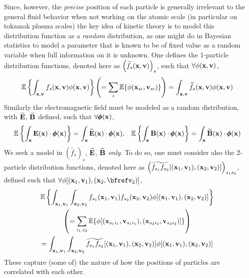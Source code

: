     Since, however, the \emph{precise} position of each particle is generally irrelevant to the general fluid behavior when not working on the atomic scale (in particular on tokamak plasma scales) the key idea of kinetic theory is to model this distribution function as a \emph{random} distribution, as one might do in Bayesian statistics to model a parameter that is known to be of fixed value as a random variable when full information on it is unknown. One defines the 1-particle distribution functions, denoted here as $\left(\widetilde{f_{s}}(\mathbf{x}, \mathbf{v})\right)_{s}$, such that $\forall \phi(\mathbf{x}, \mathbf{v})$,
    \begin{equation}
        \mathbb{E}\left\{\int_{\mathbf{x}, \mathbf{v}}f_{s}(\mathbf{x}, \mathbf{v})\phi(\mathbf{x}, \mathbf{v})\right\}
        \left(=  \sum_{i}\mathbb{E}\{\phi(\mathbf{x}_{si}, \mathbf{v}_{si})\}\right)
        =  \int_{\mathbf{x}, \mathbf{v}}\widetilde{f_{s}}(\mathbf{x}, \mathbf{v})\phi(\mathbf{x}, \mathbf{v})
    \end{equation}
    Similarly the electromagnetic field must be modeled as a random distribution, with $\widetilde{\mathbf{E}}$, $\widetilde{\mathbf{B}}$ defined, such that $\forall \pmb{\mathsf{\phi}}(\mathbf{x})$,
    \begin{align}
        \mathbb{E}\left\{\int_{\mathbf{x}}\mathbf{E}(\mathbf{x})\cdot\pmb{\mathsf{\phi}}(\mathbf{x})\right\}  =  \int_{\mathbf{x}}\widetilde{\mathbf{E}}(\mathbf{x})\cdot\pmb{\mathsf{\phi}}(\mathbf{x}),  && 
        \mathbb{E}\left\{\int_{\mathbf{x}}\mathbf{B}(\mathbf{x})\cdot\pmb{\mathsf{\phi}}(\mathbf{x})\right\}  =  \int_{\mathbf{x}}\widetilde{\mathbf{B}}(\mathbf{x})\cdot\pmb{\mathsf{\phi}}(\mathbf{x})
    \end{align}
    We seek a model in $\left(\widetilde{f_{s}}\right)_{s}$, $\widetilde{\mathbf{E}}$, $\widetilde{\mathbf{B}}$ \emph{only}. To do so, one must consider also the 2-particle distribution functions, denoted here as $\left(\widetilde{f_{s_{1}}f_{s_{2}}}[(\mathbf{x}_{1}, \mathbf{v}_{1}), (\mathbf{x}_{2}, \mathbf{v}_{2})]\right)_{s_{1}s_{2}}$, defined such that $\forall \phi[(\bfx_{1}, \bfv_{1}), (\bfx_{2}, \bfrefv_{2})]$,
    \begin{multline}
        \mathbb{E}\left\{\int_{\mathbf{x}_{1}, \mathbf{v}_{1}}\int_{\mathbf{x}_{2}, \mathbf{v}_{2}}f_{s_{1}}(\mathbf{x}_{1}, \mathbf{v}_{1})f_{s_{2}}(\mathbf{x}_{2}, \mathbf{v}_{2})\phi[(\mathbf{x}_{1}, \mathbf{v}_{1}), (\mathbf{x}_{2}, \mathbf{v}_{2})]\right\}  \\
        \left(=  \sum_{i_{1}, i_{2}}\mathbb{E}\{\phi[(\mathbf{x}_{s_{1}i_{1}}, \mathbf{v}_{s_{1}i_{1}}), (\mathbf{x}_{s_{2}i_{2}}, \mathbf{v}_{s_{2}i_{2}})]\}\right)  \\
        =  \int_{\mathbf{x}_{1}, \mathbf{v}_{1}}\int_{\mathbf{x}_{2}, \mathbf{v}_{2}}\widetilde{f_{s_{1}}f_{s_{2}}}[(\mathbf{x}_{1}, \mathbf{v}_{1}), (\mathbf{x}_{2}, \mathbf{v}_{2})]\phi[(\mathbf{x}_{1}, \mathbf{v}_{1}), (\mathbf{x}_{2}, \mathbf{v}_{2})]
    \end{multline}
    These capture (some of) the nature of how the positions of particles are correlated with each other.
    
